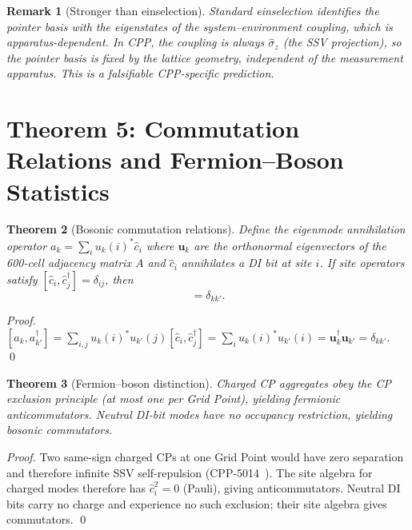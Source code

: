 \documentclass[11pt,a4paper]{article}
\newtheorem{theorem}{Theorem}[section]
\newtheorem{remark}[theorem]{Remark}
\begin{document}
\begin{remark}[Stronger than einselection]
Standard einselection \citep{zurek1981} identifies the pointer basis
with the eigenstates of the system--environment coupling, which is
apparatus-dependent. In CPP, the coupling is always $\hat{\sigma}_z$
(the SSV projection), so the pointer basis is fixed by the lattice
geometry, independent of the measurement apparatus.
This is a falsifiable CPP-specific prediction.
\end{remark}

\section{Theorem 5: Commutation Relations and Fermion--Boson Statistics}

\begin{theorem}[Bosonic commutation relations]
\label{thm:commutators}
Define the eigenmode annihilation operator
$a_k = \sum_i u_k(i)^*\hat{c}_i$
where $\mathbf{u}_k$ are the orthonormal eigenvectors of the 600-cell
adjacency matrix $A$ and $\hat{c}_i$ annihilates a DI bit at site $i$.
If site operators satisfy $[\hat{c}_i,\hat{c}_j^\dagger] = \delta_{ij}$,
then
\begin{equation}
[a_k, a_{k'}^\dagger] = \delta_{kk'}.
\label{eq:commutators}
\end{equation}
\end{theorem}

\begin{proof}
$[a_k,a_{k'}^\dagger] = \sum_{i,j}u_k(i)^*u_{k'}(j)[\hat{c}_i,\hat{c}_j^\dagger]
= \sum_i u_k(i)^*u_{k'}(i) = \mathbf{u}_k^\dagger\mathbf{u}_{k'}
= \delta_{kk'}$. \qed
\end{proof}

\begin{theorem}[Fermion--boson distinction]
\label{thm:fermboson}
Charged CP aggregates obey the CP exclusion principle (at most one per
Grid Point), yielding fermionic anticommutators. Neutral DI-bit modes
have no occupancy restriction, yielding bosonic commutators.
\end{theorem}

\begin{proof}
Two same-sign charged CPs at one Grid Point would have zero separation
and therefore infinite SSV self-repulsion (CPP-5014~\citep{cpp5014}).
The site algebra for charged modes therefore has $\hat{c}_i^2 = 0$
(Pauli), giving anticommutators.
Neutral DI bits carry no charge and experience no such exclusion;
their site algebra gives commutators. \qed
\end{proof}
\end{document}
